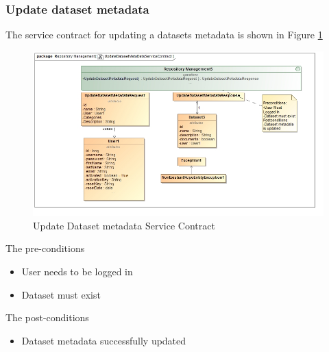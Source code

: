 \subsubsection {Update dataset metadata}
The service contract for updating a datasets metadata is shown in Figure \ref{fig:updateDatasetMetadataServiceContract}
\begin{figure}[H]
	\begin{center}
		\includegraphics[scale=0.6]{../Diagrams and Charts/Test Data/UpdateDatasetMetadataServiceContract.jpg}
		\caption{Update Dataset metadata Service Contract}
		\label{fig:updateDatasetMetadataServiceContract}
	\end{center}
	
\end{figure}

The pre-conditions
\begin{itemize}
	\item User needs to be logged in
	\item Dataset must exist
\end{itemize}

The post-conditions
\begin{itemize}
	\item Dataset metadata successfully updated
\end{itemize}

